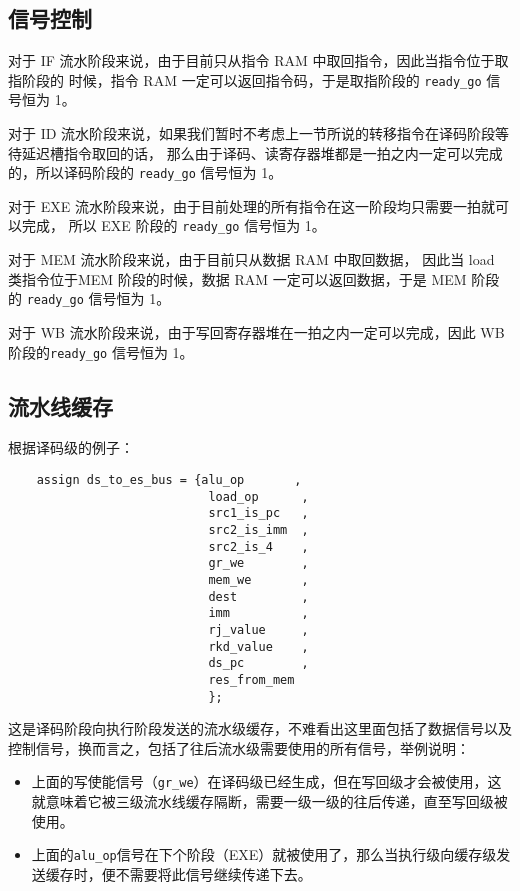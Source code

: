 \subsection{信号控制}

对于 IF 流水阶段来说，由于目前只从指令 RAM 中取回指令，因此当指令位于取指阶段的
时候，指令 RAM 一定可以返回指令码，于是取指阶段的 \texttt{ready\_go} 信号恒为 1。

对于 ID 流水阶段来说，如果我们暂时不考虑上一节所说的转移指令在译码阶段等待延迟槽指令取回的话，
那么由于译码、读寄存器堆都是一拍之内一定可以完成的，所以译码阶段的 \texttt{ready\_go} 信号恒为 1。

对于 EXE 流水阶段来说，由于目前处理的所有指令在这一阶段均只需要一拍就可以完成，
所以 EXE 阶段的 \texttt{ready\_go} 信号恒为 1。

对于 MEM 流水阶段来说，由于目前只从数据 RAM 中取回数据，
因此当 load 类指令位于MEM 阶段的时候，数据 RAM 一定可以返回数据，于是 MEM 阶段的 \texttt{ready\_go} 信号恒为 1。

对于 WB 流水阶段来说，由于写回寄存器堆在一拍之内一定可以完成，因此 WB 阶段的\texttt{ready\_go} 信号恒为 1。

\subsection{流水线缓存}

根据译码级的例子：

\begin{lstlisting}
    assign ds_to_es_bus = {alu_op       ,  
                            load_op      ,  
                            src1_is_pc   ,   
                            src2_is_imm  ,  
                            src2_is_4    ,  
                            gr_we        , 
                            mem_we       ,   
                            dest         ,   
                            imm          ,  
                            rj_value     ,   
                            rkd_value    ,   
                            ds_pc        ,    
                            res_from_mem
                            };

\end{lstlisting}

这是译码阶段向执行阶段发送的流水级缓存，不难看出这里面包括了数据信号以及控制信号，换而言之，包括了往后流水级需要使用的所有信号，举例说明：

\begin{itemize}
    \item 上面的写使能信号（\texttt{gr\_we}）在译码级已经生成，但在写回级才会被使用，这就意味着它被三级流水线缓存隔断，需要一级一级的往后传递，直至写回级被使用。
    \item 上面的\texttt{alu\_op}信号在下个阶段（EXE）就被使用了，那么当执行级向缓存级发送缓存时，便不需要将此信号继续传递下去。
\end{itemize}


